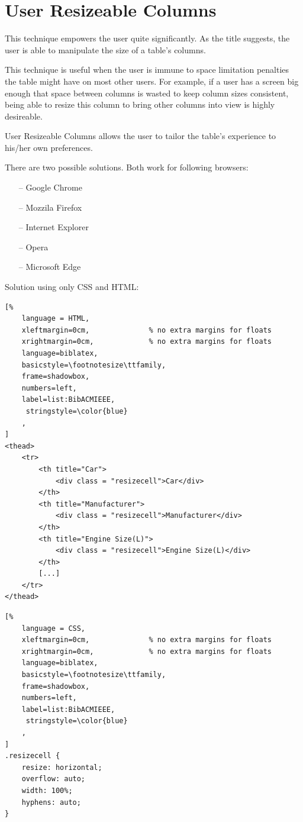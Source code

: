 \newpage
\section{User Resizeable Columns}
This technique empowers the user quite significantly. As the title suggests, the user is able to manipulate the size of a table's columns. 

This technique is useful when the user is immune to space limitation penalties the table might have on most other users. For example, if a user has a screen big enough that space between columns is wasted to keep column sizes consistent, being able to resize this column to bring other columns into view is highly desireable.

User Resizeable Columns allows the user to tailor the table's experience to his/her own preferences. 

There are two possible solutions. Both work for following browsers:
\begin{itemize}
    \item[--] Google Chrome
    \item[--] Mozzila Firefox
    \item[--] Internet Explorer
    \item[--] Opera
    \item[--] Microsoft Edge
\end{itemize}

Solution using only CSS and HTML:
\begin{lstlisting}[%
    language = HTML,
    xleftmargin=0cm,              % no extra margins for floats
    xrightmargin=0cm,             % no extra margins for floats
    language=biblatex,
    basicstyle=\footnotesize\ttfamily,
    frame=shadowbox,
    numbers=left,
    label=list:BibACMIEEE,
     stringstyle=\color{blue}
    ,
]
<thead>
    <tr>
        <th title="Car">
            <div class = "resizecell">Car</div>
        </th>
        <th title="Manufacturer">
            <div class = "resizecell">Manufacturer</div>
        </th>
        <th title="Engine Size(L)">
            <div class = "resizecell">Engine Size(L)</div>
        </th>
        [...]
    </tr>
</thead>
\end{lstlisting}

\begin{lstlisting}[%
    language = CSS,
    xleftmargin=0cm,              % no extra margins for floats
    xrightmargin=0cm,             % no extra margins for floats
    language=biblatex,
    basicstyle=\footnotesize\ttfamily,
    frame=shadowbox,
    numbers=left,
    label=list:BibACMIEEE,
     stringstyle=\color{blue}
    ,
]
.resizecell {
    resize: horizontal;
    overflow: auto;
    width: 100%;
    hyphens: auto;
}
\end{lstlisting}

